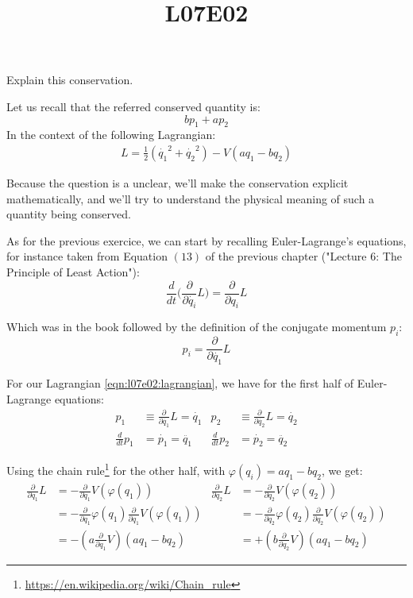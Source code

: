 \documentclass[solutions.tex]{subfiles}
\title{L07E02}
\begin{document}
\maketitle
\begin{exercise}
Explain this conservation.
\end{exercise}
Let us recall that the referred conserved quantity is:
\[
	b p_1 + a p_2
\]
In the context of the following Lagrangian:
\begin{align}
	L = \frac{1}{2}(\dot{q_1}^2+\dot{q_2}^2) - V(a q_1-b q_2)
	\label{eqn:l07e02:lagrangian}
\end{align}

Because the question is a unclear, we'll make the conservation explicit
mathematically, and we'll try to understand the physical meaning
of such a quantity being conserved.

\hrr

As for the previous exercice, we can start by recalling
Euler-Lagrange's equations, for instance taken from
Equation $(13)$ of the previous chapter ("Lecture $6$:
The Principle of Least Action"):
\[
	\frac{d}{dt}\biggl(\frac{\partial}{\partial \dot{q_i}}L\biggr)
	= \frac{\partial}{\partial q_i}L
\]

Which was in the book followed by the definition of the
conjugate momentum $p_i$:
\[
	p_i = \frac{\partial}{\partial \dot{q_1}}L
\]

For our Lagrangian \eqref{eqn:l07e02:lagrangian}, we have
for the first half of Euler-Lagrange equations:
\begin{align}
	p_1 &\equiv \frac{\partial}{\partial \dot{q_1}}L = \dot{q_1} &
	p_2 &\equiv \frac{\partial}{\partial \dot{q_2}}L = \dot{q_2} \label{eqns:l07e02:p1} \\
	\frac{d}{dt}p_1 &= \dot{p_1} = \ddot{q_1} &
	\frac{d}{dt}p_2 &= \dot{p_2} = \ddot{q_2} \label{eqns:l07e02:p2}
\end{align}

Using the chain
rule\footnote{\url{https://en.wikipedia.org/wiki/Chain\_rule}}
for the other half, with $\varphi(q_i) = a q_1 - b q_2$, we get:
\begin{align}
	\frac{\partial}{\partial q_1}L &=
		-\frac{\partial}{\partial q_1}V(\varphi(q_1)) &
	\frac{\partial}{\partial q_2}L &=
		-\frac{\partial}{\partial q_2}V(\varphi(q_2)) \nonumber \\
	~ &= -\frac{\partial}{\partial q_1}\varphi(q_1)
		\frac{\partial}{\partial q_1}V(\varphi(q_1)) &
	~ &= -\frac{\partial}{\partial q_2}\varphi(q_2)
		\frac{\partial}{\partial q_2}V(\varphi(q_2)) \nonumber \\
	~ &= -(a\frac{\partial}{\partial q_1}V)(a q_1 - b q_2) &
	~ &= +(b\frac{\partial}{\partial q_2}V)(a q_1 - b q_2) \label{eqns:l07e02:p3}
\end{align}
\end{document}
